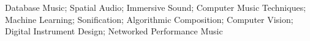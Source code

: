 Database Music; Spatial Audio; Immersive Sound; Computer Music Techniques; Machine Learning; Sonification; Algorithmic Composition; Computer Vision; Digital Instrument Design; Networked Performance Music